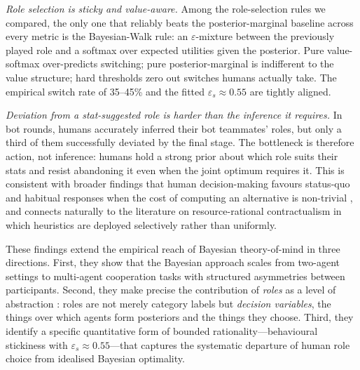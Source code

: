 \documentclass[9pt,twocolumn,twoside]{pnas-new}
\begin{document}
\emph{Role selection is sticky and value-aware.} Among the role-selection
rules we compared, the only one that reliably beats the
posterior-marginal baseline across every metric is the Bayesian-Walk
rule: an $\varepsilon$-mixture between the previously played role and a
softmax over expected utilities given the posterior. Pure
value-softmax over-predicts switching; pure posterior-marginal is
indifferent to the value structure; hard thresholds zero out switches
humans actually take. The empirical switch rate of 35--45\% and the
fitted $\varepsilon_s \approx 0.55$ are tightly aligned.

\emph{Deviation from a stat-suggested role is harder than the inference
it requires.} In bot rounds, humans accurately inferred their bot
teammates' roles, but only a third of them successfully deviated by the
final stage. The bottleneck is therefore action, not inference: humans
hold a strong prior about which role suits their stats and resist
abandoning it even when the joint optimum requires it. This is
consistent with broader findings that human decision-making favours
status-quo and habitual responses when the cost of computing an
alternative is non-trivial \cite{lieder2020resource, simon1956rational},
and connects naturally to the literature on resource-rational
contractualism \cite{trujillo2025resource, kwon2023universalization} in
which heuristics are deployed selectively rather than uniformly.

These findings extend the empirical reach of Bayesian theory-of-mind in
three directions. First, they show that the Bayesian approach scales from
two-agent settings \cite{baker2017rational, tan2019norms} to multi-agent
cooperation tasks with structured asymmetries between participants.
Second, they make precise the contribution of \emph{roles} as a level of
abstraction \cite{bakerRolesGuideRapida, bakerPeopleUseMixed2025,
mieczkowski2024specialization}: roles are not merely category labels but
\emph{decision variables}, the things over which agents form posteriors
and the things they choose. Third, they identify a specific quantitative
form of bounded rationality---behavioural stickiness with $\varepsilon_s
\approx 0.55$---that captures the systematic departure of human role
choice from idealised Bayesian optimality.
\end{document}
